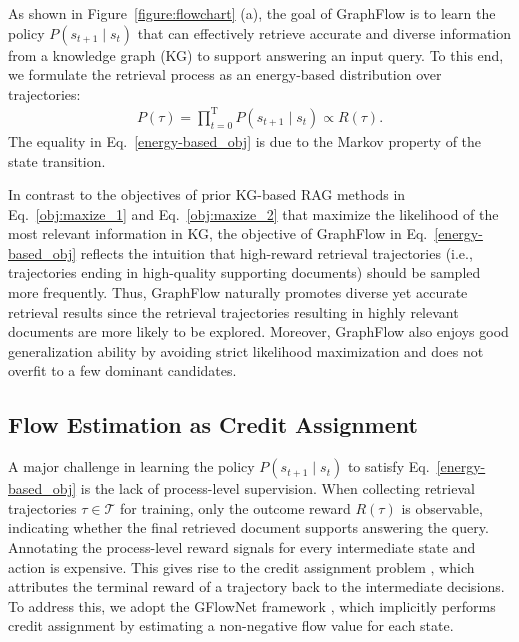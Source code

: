 As shown in Figure~\ref{figure:flowchart} (a), the goal of GraphFlow is to learn the policy $P(s_{t+1}\mid s_{t})$ that can effectively retrieve accurate and diverse information from a knowledge graph (KG) to support answering an input query. 
To this end, we formulate the retrieval process as an energy-based distribution over trajectories:
\begin{equation}
    \begin{aligned}
        P(\tau)= \prod_{t=0}^{\mathrm{T}} P(s_{t+1}\mid s_{t})\propto R(\tau).
    \end{aligned}
    \label{energy-based_obj}
\end{equation}
The equality in Eq.~\ref{energy-based_obj} is due to the Markov property of the state transition. 

In contrast to the objectives of prior KG-based RAG methods in Eq.~\ref{obj:maxize_1} and Eq.~\ref{obj:maxize_2} that maximize the likelihood of the most relevant information in KG, the objective of GraphFlow in Eq.~\ref{energy-based_obj} reflects the intuition that high-reward retrieval trajectories (i.e., trajectories ending in high-quality supporting documents) should be sampled more frequently.
Thus, GraphFlow naturally promotes diverse yet accurate retrieval results since the retrieval trajectories resulting in highly relevant documents are more likely to be explored.
Moreover, GraphFlow also enjoys good generalization ability by avoiding strict likelihood maximization and does not overfit to a few dominant candidates.


\subsection{Flow Estimation as Credit Assignment}

A major challenge in learning the policy $P(s_{t+1} \mid s_t)$ to satisfy Eq.~\ref{energy-based_obj} is the lack of process-level supervision. 
When collecting retrieval trajectories $\tau\in\mathcal{T}$ for training, only the outcome reward $R(\tau)$ is observable, indicating whether the final retrieved document supports answering the query.
Annotating the process-level reward signals for every intermediate state and action is expensive. 
This gives rise to the credit assignment problem \cite{nguyen2018credit,zhou2020learning}, which attributes the terminal reward of a trajectory back to the intermediate decisions. 
To address this, we adopt the GFlowNet framework \cite{bengio2023gflownet}, which implicitly performs credit assignment by estimating a non-negative flow value for each state.

